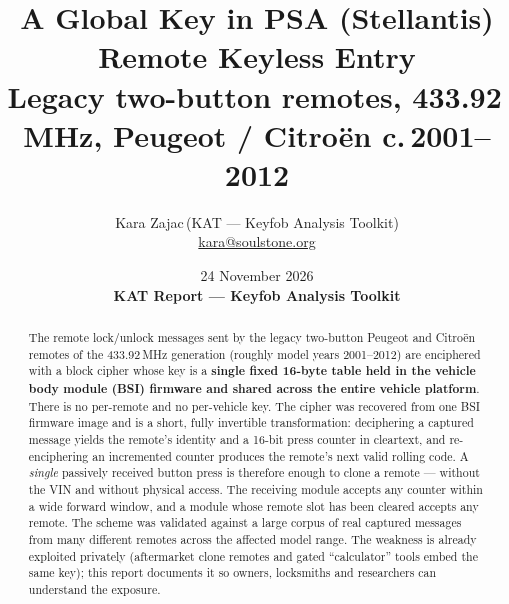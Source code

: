 \documentclass[11pt,a4paper]{article}
\title{A Global Key in PSA (Stellantis) Remote Keyless Entry\\[2pt]
\large Legacy two-button remotes, 433.92\,MHz, Peugeot / Citro\"en c.\,2001--2012}
\author{Kara Zajac\,(KAT --- Keyfob Analysis Toolkit)\\[2pt]
\small \href{mailto:kara@soulstone.org}{kara@soulstone.org}}
\date{24 November 2026 \\[4pt] \small\textbf{KAT Report --- Keyfob Analysis Toolkit}}
\begin{document}
\maketitle

\begin{abstract}
The remote lock/unlock messages sent by the legacy two-button Peugeot and Citro\"en remotes of the 433.92\,MHz generation (roughly model years 2001--2012) are enciphered with a block cipher whose key is a \textbf{single fixed 16-byte table held in the vehicle body module (BSI) firmware and shared across the entire vehicle platform}. There is no per-remote and no per-vehicle key. The cipher was recovered from one BSI firmware image and is a short, fully invertible transformation: deciphering a captured message yields the remote's identity and a 16-bit press counter in cleartext, and re-enciphering an incremented counter produces the remote's next valid rolling code. A \emph{single} passively received button press is therefore enough to clone a remote --- without the VIN and without physical access. The receiving module accepts any counter within a wide forward window, and a module whose remote slot has been cleared accepts any remote. The scheme was validated against a large corpus of real captured messages from many different remotes across the affected model range. The weakness is already exploited privately (aftermarket clone remotes and gated ``calculator'' tools embed the same key); this report documents it so owners, locksmiths and researchers can understand the exposure.
\end{abstract}
\end{document}
